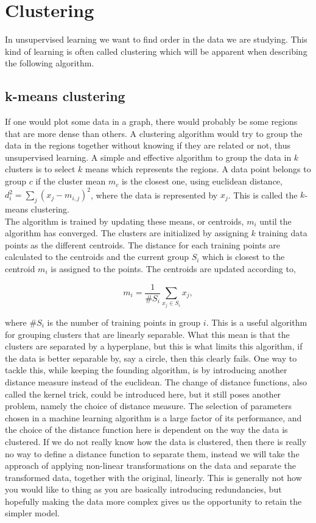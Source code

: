 \section{Clustering}

In unsupervised learning we want to find order in the data we are studying. This kind of learning is often called clustering which will be apparent when describing the following algorithm.

\subsection{k-means clustering}

If one would plot some data in a graph, there would probably be some regions that are more dense than others. A clustering algorithm would try to group the data in the regions together without knowing if they are related or not, thus unsupervised learning. A simple and effective algorithm to group the data in $k$ clusters is to select $k$ means which represents the regions. A data point belongs to group $c$ if the cluster mean $m_c$ is the closest one, using euclidean distance, $d_i^2 = \sum_{j}(x_j-m_{i,j})^2 $, where the data is represented by $x_j$. This is called the $k$-means clustering.\\

The algorithm is trained by updating these means, or centroids, $m_i$ until the algorithm has converged. The clusters are initialized by assigning $k$ training data points as the different centroids. The distance for each training points are calculated to the centroids and the current group $S_i$ which is closest to the centroid $m_i$ is assigned to the points. The centroids are updated according to,

\begin{equation}
    m_i = \frac{1}{\#S_i}\sum_{x_j\in S_i}{x_j},
\end{equation}

where $\#S_i$ is the number of training points in group $i$. This is a useful algorithm for grouping clusters that are linearly separable. What this mean is that the clusters are separated by a hyperplane, but this is what limits this algorithm, if the data is better separable by, say a circle, then this clearly fails. One way to tackle this, while keeping the founding algorithm, is by introducing another distance measure instead of the euclidean. The change of distance functions, also called the kernel trick, could be introduced here, but it still poses another problem, namely the choice of distance measure. The selection of parameters chosen in a machine learning algorithm is a large factor of its performance, and the choice of the distance function here is dependent on the way the data is clustered. If we do not really know how the data is clustered, then there is really no way to define a distance function to separate them, instead we will take the approach of applying non-linear transformations on the data and separate the transformed data, together with the original, linearly. This is generally not how you would like to thing as you are basically introducing redundancies, but hopefully making the data more complex gives us the opportunity to retain the simpler model.



